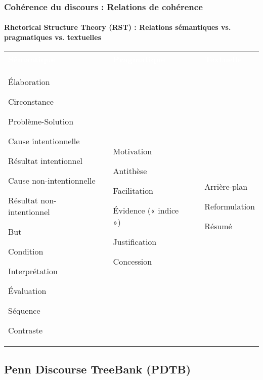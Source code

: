 \documentclass[xcolor=table]{beamer}
\begin{document}
\begin{frame}
	\frametitle{Cohérence du discours : Relations de cohérence}
	\framesubtitle{Rhetorical Structure Theory (RST) : Relations sémantiques vs. pragmatiques vs. textuelles}
	
	\footnotesize
	\begin{tabular}{p{}lp{}lp{}}
		\rowcolor{darkblue}
		\bfseries\textcolor{white}{Sémantique} && \bfseries\textcolor{white}{Pragmatique} && \bfseries\textcolor{white}{Textuelle} \\
		
		Élaboration
		
		Circonstance
		
		Problème-Solution
		
		Cause intentionnelle
		
		Résultat intentionnel
		
		Cause non-intentionnelle
		
		Résultat non-intentionnel
		
		But
		
		Condition
		
		Interprétation
		
		Évaluation
		
		Séquence
		
		Contraste
		
		&&
		
		Motivation
		
		Antithèse
		
		Facilitation
		
		Évidence (« indice »)
		
		Justification
		
		Concession
		
		&&
		
		Arrière-plan
		
		Reformulation
		
		Résumé\\
	\end{tabular}
	
\end{frame}

\subsection{Penn Discourse TreeBank (PDTB)}
\end{document}
